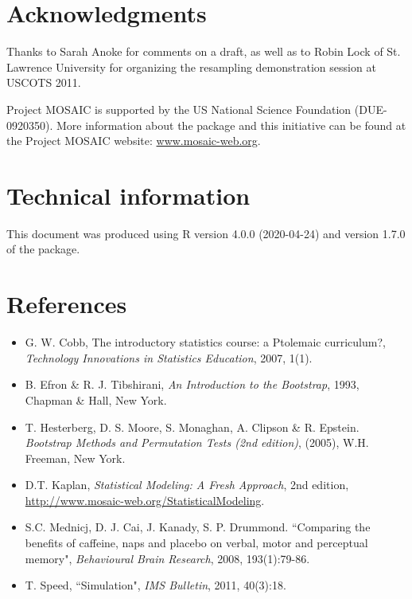 \documentclass[11pt]{article}\usepackage[]{graphicx}\usepackage[]{color}
\begin{document}
\section{Acknowledgments}

Thanks to Sarah Anoke for comments on a draft, as well as to Robin
Lock of St. Lawrence University for organizing the resampling demonstration
session at USCOTS 2011.

Project MOSAIC is supported by the US National Science Foundation (DUE-0920350).
More information about the package and this initiative can be 
found at the Project MOSAIC website: \url{www.mosaic-web.org}.

\section{Technical information}
This document was produced using R version 4.0.0 (2020-04-24) and version
1.7.0 of the  package.

\section{References}
\begin{itemize}
\item G. W. Cobb, The introductory statistics course: a Ptolemaic curriculum?, 
   \emph{Technology Innovations in Statistics Education}, 2007, 1(1).
\item B. Efron \& R. J. Tibshirani, {\em An Introduction to the Bootstrap}, 1993, Chapman \& Hall, New York.
\item T. Hesterberg, D. S. Moore, S. Monaghan, A. Clipson \& R. Epstein.  {\em Bootstrap Methods and Permutation Tests (2nd edition)}, (2005), W.H. Freeman, New York.
\item D.T. Kaplan, {\em Statistical Modeling: A Fresh Approach}, 2nd edition, \url{http://www.mosaic-web.org/StatisticalModeling}.
\item S.C. Mednicj, D. J. Cai, J. Kanady, S. P. Drummond.  ``Comparing the benefits of caffeine, naps and placebo on verbal, motor and perceptual memory", {\em Behavioural Brain Research}, 2008, 193(1):79-86.
\item T. Speed, ``Simulation", \emph{IMS Bulletin}, 2011, 40(3):18.
\end{itemize}
\end{document}
